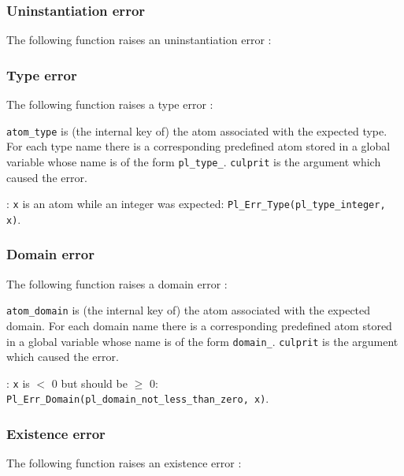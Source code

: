 
\subsubsection{Uninstantiation error}
The following function raises an uninstantiation error :


\subsubsection{Type error}
The following function raises a type error :


\texttt{atom\_type} is (the internal key of) the atom associated with the
expected type. For each type name  there is a
corresponding predefined atom stored in a global variable whose name is of
the form \texttt{pl\_type\_}. \texttt{culprit} is the argument which
caused the error.

: \texttt{x} is an atom while an integer was expected:
\texttt{Pl\_Err\_Type(pl\_type\_integer, x)}.

\subsubsection{Domain error}
The following function raises a domain error :


\texttt{atom\_domain} is (the internal key of) the atom associated with the
expected domain. For each domain name  there is a
corresponding predefined atom stored in a global variable whose name is of
the form \texttt{domain\_}. \texttt{culprit} is the argument which
caused the error.

: \texttt{x} is $<$ 0 but should be $\geq$ 0:
\texttt{Pl\_Err\_Domain(pl\_domain\_not\_less\_than\_zero, x)}.

\subsubsection{Existence error}
The following function raises an existence error :

